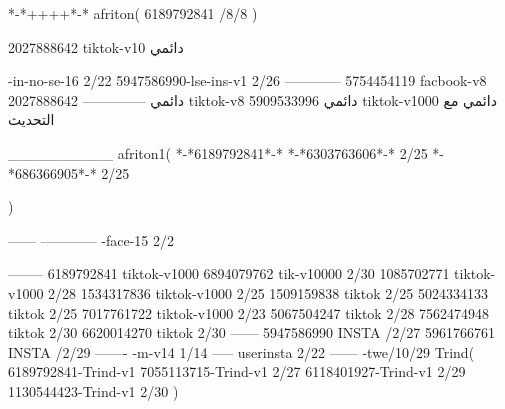 *-*++++*-*
afriton(
6189792841 /8/8
)

2027888642 tiktok-v10
دائمي

-in-no-se-16 2/22
5947586990-lse-ins-v1 2/26
------------
5754454119 facbook-v8
دائمي
--------------
2027888642 tiktok-v8
دائمي
5909533996 tiktok-v1000
دائمي مع التحديث

__________
afriton1(
*-*6189792841*-*
*-*6303763606*-* 2/25
*-*686366905*-* 2/25

)


------
------------
-face-15 2/2

--------
6189792841 tiktok-v1000
6894079762 tik-v10000 2/30
1085702771 tiktok-v1000 2/28
1534317836 tiktok-v1000 2/25
1509159838 tiktok 2/25
5024334133 tiktok 2/25
7017761722 tiktok-v1000 2/23
5067504247 tiktok 2/28
7562474948 tiktok 2/30
6620014270 tiktok 2/30
------
5947586990 INSTA /2/27
5961766761 INSTA /2/29
-------
-m-v14 1/14
-----
userinsta 2/22
------
-twe/10/29
Trind(
6189792841-Trind-v1 
7055113715-Trind-v1 2/27
6118401927-Trind-v1 2/29
1130544423-Trind-v1 2/30
)
